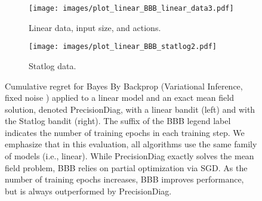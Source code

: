\documentclass{article} \usepackage{iclr2018_conference,times}
\begin{document}
\begin{figure}[t]
\begin{subfigure}[t]{0.48\textwidth}
  \centering
  \texttt{[image: images/plot\_linear\_BBB\_linear\_data3.pdf]}
  \caption{Linear data,  input size, and  actions.}
  \label{fig:linbbb1}
\end{subfigure}\begin{subfigure}[t]{0.48\textwidth}
  \centering
  \texttt{[image: images/plot\_linear\_BBB\_statlog2.pdf]}
  \caption{Statlog data.}
  \label{fig:linbbb2}
\end{subfigure}\caption{Cumulative regret for Bayes By Backprop (Variational Inference, fixed noise ) applied to a linear model and an exact mean field solution, denoted PrecisionDiag, with a linear bandit (left) and with the Statlog bandit (right). The suffix of the BBB legend label indicates the number of training epochs in each training step. We emphasize that in this evaluation, all algorithms use the same family of models (i.e., linear). While PrecisionDiag exactly solves the mean field problem, BBB relies on partial optimization via SGD. As the number of training epochs increases, BBB improves performance, but is always outperformed by PrecisionDiag.} \label{fig:linbbb}
\end{figure}
\end{document}
